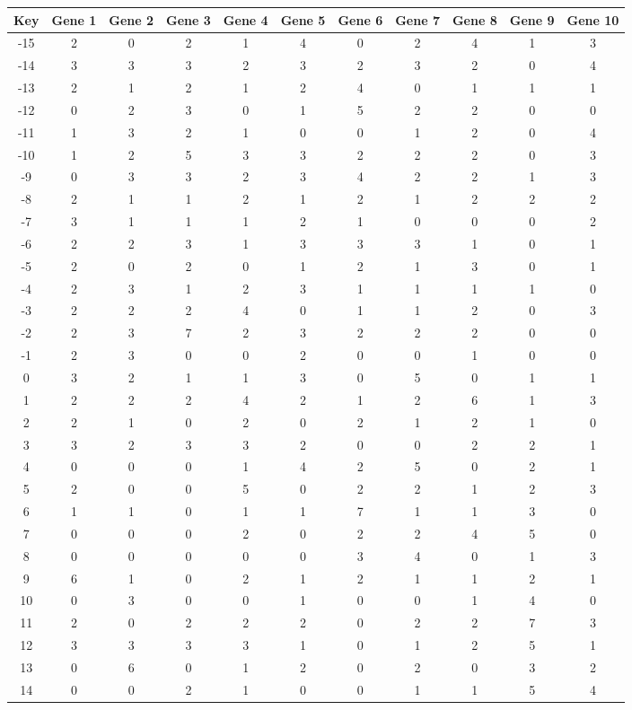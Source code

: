 \begin{tabular}{|c|c|c|c|c|c|c|c|c|c|c|}
\hline
Key & Gene 1 & Gene 2 & Gene 3 & Gene 4 & Gene 5 & Gene 6 & Gene 7 & Gene 8 & Gene 9 & Gene 10 \\
\hline
-15 & 2 & 0 & 2 & 1 & 4 & 0 & 2 & 4 & 1 & 3 \\
-14 & 3 & 3 & 3 & 2 & 3 & 2 & 3 & 2 & 0 & 4 \\
-13 & 2 & 1 & 2 & 1 & 2 & 4 & 0 & 1 & 1 & 1 \\
-12 & 0 & 2 & 3 & 0 & 1 & 5 & 2 & 2 & 0 & 0 \\
-11 & 1 & 3 & 2 & 1 & 0 & 0 & 1 & 2 & 0 & 4 \\
-10 & 1 & 2 & 5 & 3 & 3 & 2 & 2 & 2 & 0 & 3 \\
-9 & 0 & 3 & 3 & 2 & 3 & 4 & 2 & 2 & 1 & 3 \\
-8 & 2 & 1 & 1 & 2 & 1 & 2 & 1 & 2 & 2 & 2 \\
-7 & 3 & 1 & 1 & 1 & 2 & 1 & 0 & 0 & 0 & 2 \\
-6 & 2 & 2 & 3 & 1 & 3 & 3 & 3 & 1 & 0 & 1 \\
-5 & 2 & 0 & 2 & 0 & 1 & 2 & 1 & 3 & 0 & 1 \\
-4 & 2 & 3 & 1 & 2 & 3 & 1 & 1 & 1 & 1 & 0 \\
-3 & 2 & 2 & 2 & 4 & 0 & 1 & 1 & 2 & 0 & 3 \\
-2 & 2 & 3 & 7 & 2 & 3 & 2 & 2 & 2 & 0 & 0 \\
-1 & 2 & 3 & 0 & 0 & 2 & 0 & 0 & 1 & 0 & 0 \\
0 & 3 & 2 & 1 & 1 & 3 & 0 & 5 & 0 & 1 & 1 \\
1 & 2 & 2 & 2 & 4 & 2 & 1 & 2 & 6 & 1 & 3 \\
2 & 2 & 1 & 0 & 2 & 0 & 2 & 1 & 2 & 1 & 0 \\
3 & 3 & 2 & 3 & 3 & 2 & 0 & 0 & 2 & 2 & 1 \\
4 & 0 & 0 & 0 & 1 & 4 & 2 & 5 & 0 & 2 & 1 \\
5 & 2 & 0 & 0 & 5 & 0 & 2 & 2 & 1 & 2 & 3 \\
6 & 1 & 1 & 0 & 1 & 1 & 7 & 1 & 1 & 3 & 0 \\
7 & 0 & 0 & 0 & 2 & 0 & 2 & 2 & 4 & 5 & 0 \\
8 & 0 & 0 & 0 & 0 & 0 & 3 & 4 & 0 & 1 & 3 \\
9 & 6 & 1 & 0 & 2 & 1 & 2 & 1 & 1 & 2 & 1 \\
10 & 0 & 3 & 0 & 0 & 1 & 0 & 0 & 1 & 4 & 0 \\
11 & 2 & 0 & 2 & 2 & 2 & 0 & 2 & 2 & 7 & 3 \\
12 & 3 & 3 & 3 & 3 & 1 & 0 & 1 & 2 & 5 & 1 \\
13 & 0 & 6 & 0 & 1 & 2 & 0 & 2 & 0 & 3 & 2 \\
14 & 0 & 0 & 2 & 1 & 0 & 0 & 1 & 1 & 5 & 4 \\
\hline
\end{tabular}